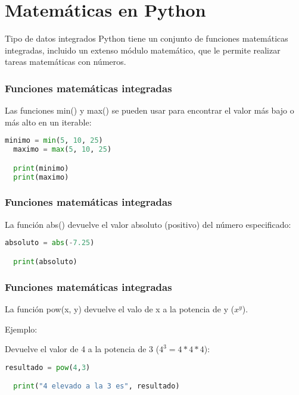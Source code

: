 \section{Matemáticas en Python}

\begin{frame}[c]{Tipo de datos integrados}
  Python tiene un conjunto de funciones matemáticas integradas,
  incluido un extenso módulo matemático, que le permite realizar
  tareas matemáticas con números.
\end{frame}

\begin{frame}[fragile]
  \frametitle{Funciones matemáticas integradas}

  Las funciones \textcolor{codeKeyword}{min}() y
  \textcolor{codeKeyword}{max}() se pueden
  usar para encontrar el valor más bajo o más alto en un iterable:

  \begin{lstlisting}[language=Python]
  minimo = min(5, 10, 25)
  maximo = max(5, 10, 25)

  print(minimo)
  print(maximo)
  \end{lstlisting}
\end{frame}

\begin{frame}[fragile]
  \frametitle{Funciones matemáticas integradas}

  La función \textcolor{codeKeyword}{abs}() devuelve el
  valor absoluto (positivo) del número especificado:

  \begin{lstlisting}[language=Python]
  absoluto = abs(-7.25)

  print(absoluto)
  \end{lstlisting}
\end{frame}

\begin{frame}[fragile]
  \frametitle{Funciones matemáticas integradas}

  La función \textcolor{codeKeyword}{pow(x, y)} devuelve el valo
  de x a la potencia de y ($x^y$).

  \vspace{\baselineskip}
  Ejemplo:

  \vspace{\baselineskip}
  Devuelve el valor de 4 a la potencia de 3 ($4^3 = 4 * 4 * 4$):
  \begin{lstlisting}[language=Python]
  resultado = pow(4,3)

  print("4 elevado a la 3 es", resultado)
  \end{lstlisting}
\end{frame}

